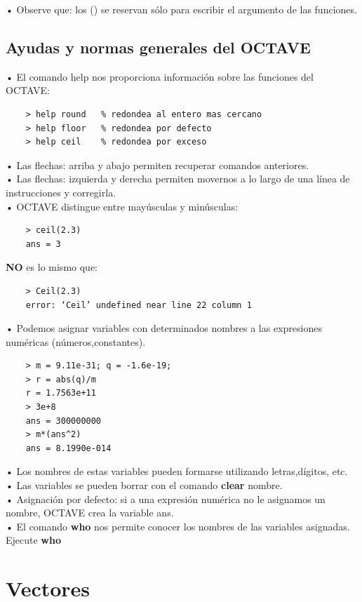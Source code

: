 \documentclass[a4,12pt]{article}
\begin{document}
• Observe que: los () se reservan sólo para escribir el argumento de las funciones.

\subsection{Ayudas y normas generales del OCTAVE}

• El comando help nos proporciona información sobre las funciones del OCTAVE:\\
\begin{verbatim}
    > help round   % redondea al entero mas cercano
    > help floor   % redondea por defecto
    > help ceil    % redondea por exceso
\end{verbatim}
• Las flechas: arriba y abajo permiten recuperar comandos anteriores.\\
• Las flechas: izquierda y derecha permiten movernos a lo largo de una línea de instrucciones y corregirla.\\
• OCTAVE distingue entre mayúsculas y minúsculas:\\
\begin{verbatim}
    > ceil(2.3)
    ans = 3
\end{verbatim}
\textbf{NO} es lo mismo que:\\
\begin{verbatim}
    > Ceil(2.3)
    error: ‘Ceil’ undefined near line 22 column 1
\end{verbatim}
• Podemos asignar variables con determinados nombres a las expresiones numéricas (números,constantes).\\
\begin{verbatim}
    > m = 9.11e-31; q = -1.6e-19;
    > r = abs(q)/m
    r = 1.7563e+11
    > 3e+8
    ans = 300000000
    > m*(ans^2)
    ans = 8.1990e-014
\end{verbatim}
• Los nombres de estas variables pueden formarse utilizando letras,dígitos, etc.\\
• Las variables se pueden borrar con el comando \textbf{clear} nombre.\\
• Asignación por defecto: si a una expresión numérica no le asignamos un nombre, OCTAVE crea la variable ans.\\
• El comando \textbf{who} nos permite conocer los nombres de las variables asignadas. Ejecute \textbf{who}

\section{Vectores}
\end{document}
